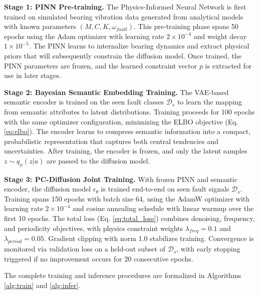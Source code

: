 \documentclass[journal]{IEEEtran}
\begin{document}
\textbf{Stage 1: PINN Pre-training.} The Physics-Informed Neural Network is first trained on simulated bearing vibration data generated from analytical models with known parameters $(M, C, K, \omega_{fault})$. This pre-training phase spans 50 epochs using the Adam optimizer with learning rate $2 \times 10^{-4}$ and weight decay $1 \times 10^{-5}$. The PINN learns to internalize bearing dynamics and extract physical priors that will subsequently constrain the diffusion model. Once trained, the PINN parameters are frozen, and the learned constraint vector $p$ is extracted for use in later stages.

\textbf{Stage 2: Bayesian Semantic Embedding Training.} The VAE-based semantic encoder is trained on the seen fault classes $\mathcal{D}_s$ to learn the mapping from semantic attributes to latent distributions. Training proceeds for 100 epochs with the same optimizer configuration, minimizing the ELBO objective (Eq. \ref{eq:elbo}). The encoder learns to compress semantic information into a compact, probabilistic representation that captures both central tendencies and uncertainties. After training, the encoder is frozen, and only the latent samples $z \sim q_\phi(z|a)$ are passed to the diffusion model.

\textbf{Stage 3: PC-Diffusion Joint Training.} With frozen PINN and semantic encoder, the diffusion model $\epsilon_\theta$ is trained end-to-end on seen fault signals $\mathcal{D}_s$. Training spans 150 epochs with batch size 64, using the AdamW optimizer with learning rate $2 \times 10^{-4}$ and cosine annealing schedule with linear warmup over the first 10 epochs. The total loss (Eq. \ref{eq:total_loss}) combines denoising, frequency, and periodicity objectives, with physics constraint weights $\lambda_{freq}=0.1$ and $\lambda_{period}=0.05$. Gradient clipping with norm 1.0 stabilizes training. Convergence is monitored via validation loss on a held-out subset of $\mathcal{D}_s$, with early stopping triggered if no improvement occurs for 20 consecutive epochs.

The complete training and inference procedures are formalized in Algorithms \ref{alg:train} and \ref{alg:infer}.
\end{document}

